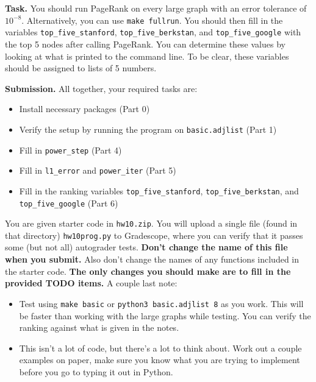 \documentclass{article}
\theoremstyle{remark}
\begin{document}
\smallskip
\noindent
\textbf{Task.}
You should run PageRank on every large graph with an error tolerance of $10^{-8}$.
Alternatively, you can use \texttt{make fullrun}.
You should then fill in the variables \texttt{top\_five\_stanford}, \texttt{top\_five\_berkstan}, and \texttt{top\_five\_google} with the top 5 nodes after calling PageRank.
You can determine these values by looking at what is printed to the command line.
To be clear, these variables should be assigned to lists of 5 numbers.

\bigskip
\noindent
\textbf{Submission.}
All together, your required tasks are:
\begin{itemize}
\item Install necessary packages (Part 0)
\item Verify the setup by running the program on \texttt{basic.adjlist} (Part 1)
\item Fill in \texttt{power\_step} (Part 4)
\item Fill in \texttt{l1\_error} and \texttt{power\_iter} (Part 5)
\item Fill in the ranking variables \texttt{top\_five\_stanford}, \texttt{top\_five\_berkstan}, and \texttt{top\_five\_google} (Part 6)
\end{itemize}
You are given starter code in \texttt{hw10.zip}.
You will upload a single file (found in that directory) \texttt{hw10prog.py} to Gradescope, where you can verify that it passes some (but not all) autograder tests.
\textbf{Don't change the name of this file when you submit.}
Also don't change the names of any functions included in the starter code.
\textbf{The only changes you should make are to fill in the provided TODO items.}
A couple last note:
\begin{itemize}
\item
  Test using \texttt{make basic} or \texttt{python3 basic.adjlist 8} as you work.
  This will be faster than working with the large graphs while testing.
  You can verify the ranking against what is given in the notes.
\item
  This isn't a lot of code, but there's a lot to think about.
  Work out a couple examples on paper, make sure you know what you are trying to implement before you go to typing it out in Python.
\end{itemize}
\end{document}
